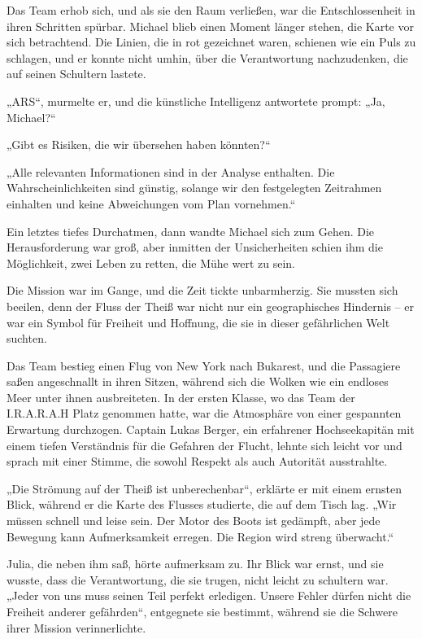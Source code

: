 \documentclass[
]{article}
\begin{document}
Das Team erhob sich, und als sie den Raum verließen, war die
Entschlossenheit in ihren Schritten spürbar. Michael blieb einen Moment
länger stehen, die Karte vor sich betrachtend. Die Linien, die in rot
gezeichnet waren, schienen wie ein Puls zu schlagen, und er konnte nicht
umhin, über die Verantwortung nachzudenken, die auf seinen Schultern
lastete.

„ARS``, murmelte er, und die künstliche Intelligenz antwortete prompt:
„Ja, Michael?{\kern0pt}``

„Gibt es Risiken, die wir übersehen haben könnten?{\kern0pt}``

„Alle relevanten Informationen sind in der Analyse enthalten. Die
Wahrscheinlichkeiten sind günstig, solange wir den festgelegten
Zeitrahmen einhalten und keine Abweichungen vom Plan vornehmen.``

Ein letztes tiefes Durchatmen, dann wandte Michael sich zum Gehen. Die
Herausforderung war groß, aber inmitten der Unsicherheiten schien ihm
die Möglichkeit, zwei Leben zu retten, die Mühe wert zu sein.

Die Mission war im Gange, und die Zeit tickte unbarmherzig. Sie mussten
sich beeilen, denn der Fluss der Theiß war nicht nur ein geographisches
Hindernis -- er war ein Symbol für Freiheit und Hoffnung, die sie in
dieser gefährlichen Welt suchten.

Das Team bestieg einen Flug von New York nach Bukarest, und die
Passagiere saßen angeschnallt in ihren Sitzen, während sich die Wolken
wie ein endloses Meer unter ihnen ausbreiteten. In der ersten Klasse, wo
das Team der I.R.A.R.A.H Platz genommen hatte, war die Atmosphäre von
einer gespannten Erwartung durchzogen. Captain Lukas Berger, ein
erfahrener Hochseekapitän mit einem tiefen Verständnis für die Gefahren
der Flucht, lehnte sich leicht vor und sprach mit einer Stimme, die
sowohl Respekt als auch Autorität ausstrahlte.

„Die Strömung auf der Theiß ist unberechenbar``, erklärte er mit einem
ernsten Blick, während er die Karte des Flusses studierte, die auf dem
Tisch lag. „Wir müssen schnell und leise sein. Der Motor des Boots ist
gedämpft, aber jede Bewegung kann Aufmerksamkeit erregen. Die Region
wird streng überwacht.``

Julia, die neben ihm saß, hörte aufmerksam zu. Ihr Blick war ernst, und
sie wusste, dass die Verantwortung, die sie trugen, nicht leicht zu
schultern war. „Jeder von uns muss seinen Teil perfekt erledigen. Unsere
Fehler dürfen nicht die Freiheit anderer gefährden``, entgegnete sie
bestimmt, während sie die Schwere ihrer Mission verinnerlichte.
\end{document}
